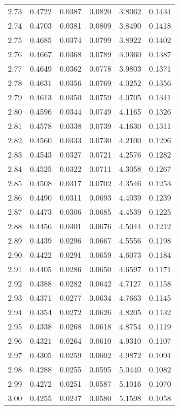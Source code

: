 \documentclass{article}
\begin{document}
\begin{longtable}{cccccc}
2.73 & 0.4722 & 0.0387 & 0.0820 & 3.8062 & 0.1434 \\
2.74 & 0.4703 & 0.0381 & 0.0809 & 3.8490 & 0.1418 \\
2.75 & 0.4685 & 0.0374 & 0.0799 & 3.8922 & 0.1402 \\
2.76 & 0.4667 & 0.0368 & 0.0789 & 3.9360 & 0.1387 \\
2.77 & 0.4649 & 0.0362 & 0.0778 & 3.9803 & 0.1371 \\
2.78 & 0.4631 & 0.0356 & 0.0769 & 4.0252 & 0.1356 \\
2.79 & 0.4613 & 0.0350 & 0.0759 & 4.0705 & 0.1341 \\
2.80 & 0.4596 & 0.0344 & 0.0749 & 4.1165 & 0.1326 \\
2.81 & 0.4578 & 0.0338 & 0.0739 & 4.1630 & 0.1311 \\
2.82 & 0.4560 & 0.0333 & 0.0730 & 4.2100 & 0.1296 \\
2.83 & 0.4543 & 0.0327 & 0.0721 & 4.2576 & 0.1282 \\
2.84 & 0.4525 & 0.0322 & 0.0711 & 4.3058 & 0.1267 \\
2.85 & 0.4508 & 0.0317 & 0.0702 & 4.3546 & 0.1253 \\
2.86 & 0.4490 & 0.0311 & 0.0693 & 4.4039 & 0.1239 \\
2.87 & 0.4473 & 0.0306 & 0.0685 & 4.4539 & 0.1225 \\
2.88 & 0.4456 & 0.0301 & 0.0676 & 4.5044 & 0.1212 \\
2.89 & 0.4439 & 0.0296 & 0.0667 & 4.5556 & 0.1198 \\
2.90 & 0.4422 & 0.0291 & 0.0659 & 4.6073 & 0.1184 \\
2.91 & 0.4405 & 0.0286 & 0.0650 & 4.6597 & 0.1171 \\
2.92 & 0.4388 & 0.0282 & 0.0642 & 4.7127 & 0.1158 \\
2.93 & 0.4371 & 0.0277 & 0.0634 & 4.7663 & 0.1145 \\
2.94 & 0.4354 & 0.0272 & 0.0626 & 4.8205 & 0.1132 \\
2.95 & 0.4338 & 0.0268 & 0.0618 & 4.8754 & 0.1119 \\
2.96 & 0.4321 & 0.0264 & 0.0610 & 4.9310 & 0.1107 \\
2.97 & 0.4305 & 0.0259 & 0.0602 & 4.9872 & 0.1094 \\
2.98 & 0.4288 & 0.0255 & 0.0595 & 5.0440 & 0.1082 \\
2.99 & 0.4272 & 0.0251 & 0.0587 & 5.1016 & 0.1070 \\
3.00 & 0.4255 & 0.0247 & 0.0580 & 5.1598 & 0.1058 \\

\end{longtable}
\end{document}
